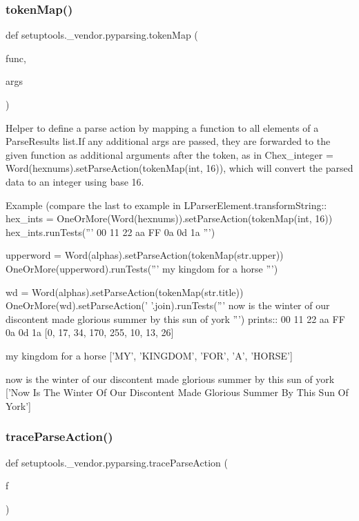 \subsubsection{\texorpdfstring{token\+Map()}{tokenMap()}}
{\footnotesize\ttfamily def setuptools.\+\_\+vendor.\+pyparsing.\+token\+Map (\begin{DoxyParamCaption}\item[{}]{func,  }\item[{}]{args }\end{DoxyParamCaption})}

\begin{DoxyVerb}Helper to define a parse action by mapping a function to all elements of a ParseResults list.If any additional 
args are passed, they are forwarded to the given function as additional arguments after
the token, as in C{hex_integer = Word(hexnums).setParseAction(tokenMap(int, 16))}, which will convert the
parsed data to an integer using base 16.

Example (compare the last to example in L{ParserElement.transformString}::
    hex_ints = OneOrMore(Word(hexnums)).setParseAction(tokenMap(int, 16))
    hex_ints.runTests('''
        00 11 22 aa FF 0a 0d 1a
        ''')
    
    upperword = Word(alphas).setParseAction(tokenMap(str.upper))
    OneOrMore(upperword).runTests('''
        my kingdom for a horse
        ''')

    wd = Word(alphas).setParseAction(tokenMap(str.title))
    OneOrMore(wd).setParseAction(' '.join).runTests('''
        now is the winter of our discontent made glorious summer by this sun of york
        ''')
prints::
    00 11 22 aa FF 0a 0d 1a
    [0, 17, 34, 170, 255, 10, 13, 26]

    my kingdom for a horse
    ['MY', 'KINGDOM', 'FOR', 'A', 'HORSE']

    now is the winter of our discontent made glorious summer by this sun of york
    ['Now Is The Winter Of Our Discontent Made Glorious Summer By This Sun Of York']
\end{DoxyVerb}
 \mbox{\label{namespacesetuptools_1_1__vendor_1_1pyparsing_af9395a9f6f052897698d7d36db00c167}} 
\subsubsection{\texorpdfstring{trace\+Parse\+Action()}{traceParseAction()}}
{\footnotesize\ttfamily def setuptools.\+\_\+vendor.\+pyparsing.\+trace\+Parse\+Action (\begin{DoxyParamCaption}\item[{}]{f }\end{DoxyParamCaption})}

